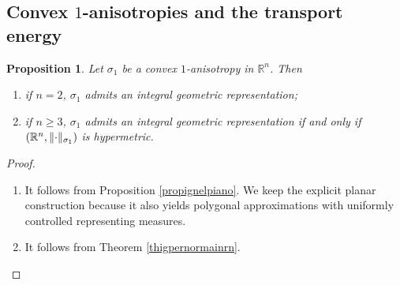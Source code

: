 \documentclass{article}
\numberwithin{equation}{section}
\theoremstyle{plain}%
\newtheorem{proposition}[theorem]{Proposition}
\theoremstyle{definition}
\theoremstyle{definition}
\newcommand{\rgrande}{\mathbb{R}}
\DeclarePairedDelimiter{\norma}{\lVert}{\rVert} %
\begin{document}
\subsection{Convex $1$-anisotropies and the transport energy}
\begin{proposition}\label{propanisotropiaeig}
    Let $\sigma_1$ be a convex $1$-anisotropy in $\rgrande^n$. Then
    \begin{enumerate}
        \item if $n=2$, $\sigma_1$ admits an integral geometric representation;
        \item if $n \geq 3$, $\sigma_1$ admits an integral geometric representation if and only if $(\rgrande^n, \norma{\cdot}_{\sigma_1})$ is hypermetric.
    \end{enumerate}
\end{proposition}
\begin{proof}
    \begin{enumerate}
        \item It follows from Proposition \ref{propignelpiano}. We keep the explicit planar construction because it also yields polygonal approximations with uniformly controlled representing measures.
        \item It follows from Theorem \ref{thigpernormainrn}.
    \end{enumerate}
\end{proof}
\end{document}

